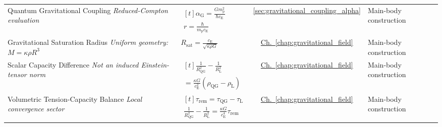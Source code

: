 \begin{longtable}{@{} p{4.5cm} p{6cm} c p{4cm} @{}}
{\raggedright Quantum Gravitational Coupling \newline \textit{Reduced-Compton evaluation}\par} & {\raggedright $\begin{gathered}[t]\alpha_{\mathrm G}=\frac{Gm_{\mathrm p}^2}{\hbar c_{\mathrm E}} \\ r=\frac{\hbar}{m_{\mathrm p}c_{\mathrm E}}\end{gathered}$\par} & \hyperref[sec:gravitational_coupling_alpha]{\ref*{sec:gravitational_coupling_alpha}} & {\raggedright Main-body construction\par} \\

{\raggedright Gravitational Saturation Radius \newline \textit{Uniform geometry: $M=\kappa\rho R^3$}\par} & {\raggedright $R_{\mathrm{sat}}=\frac{c_{\mathrm E}}{\sqrt{\kappa\rho G}}$\par} & \hyperref[chap:gravitational_field]{Ch.~\ref*{chap:gravitational_field}} & {\raggedright Main-body construction\par} \\

{\raggedright Scalar Capacity Difference \newline \textit{Not an induced Einstein-tensor norm}\par} & {\raggedright $\begin{gathered}[t]\frac1{R_{\mathrm{QG}}^2}-\frac1{R_{\mathrm L}^2} \\ =\frac{\kappa G}{c_{\mathrm E}^2}(\rho_{\mathrm{QG}}-\rho_{\mathrm L})\end{gathered}$\par} & \hyperref[chap:gravitational_field]{Ch.~\ref*{chap:gravitational_field}} & {\raggedright Main-body construction\par} \\

{\raggedright Volumetric Tension-Capacity Balance \newline \textit{Local convergence sector}\par} & {\raggedright $\begin{gathered}[t]\tau_{\mathrm{rem}}=\tau_{\mathrm{QG}}-\tau_{\mathrm L} \\ \frac1{R_{\mathrm{QG}}^2}-\frac1{R_{\mathrm L}^2}=\frac{\kappa G}{c_{\mathrm E}^4}\tau_{\mathrm{rem}}\end{gathered}$\par} & \hyperref[chap:gravitational_field]{Ch.~\ref*{chap:gravitational_field}} & {\raggedright Main-body construction\par} \\


\end{longtable}
